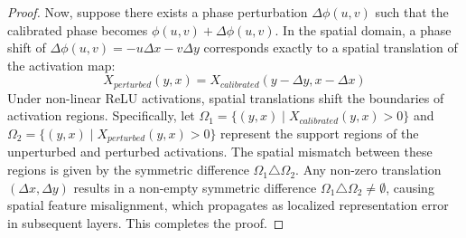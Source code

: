 \documentclass{article}
\theoremstyle{plain}
\theoremstyle{definition}
\theoremstyle{remark}
\begin{document}
\begin{proof}
  Now, suppose there exists a phase perturbation $\Delta \phi(u, v)$ such that the calibrated phase becomes $\phi(u, v) + \Delta \phi(u, v)$. In the spatial domain, a phase shift of $\Delta \phi(u, v) = -u \Delta x - v \Delta y$ corresponds exactly to a spatial translation of the activation map:
  \begin{equation}
    X_{perturbed}(y, x) = X_{calibrated}(y - \Delta y, x - \Delta x)
  \end{equation}
  Under non-linear ReLU activations, spatial translations shift the boundaries of activation regions. Specifically, let $\Omega_1 = \{(y, x) \mid X_{calibrated}(y, x) > 0\}$ and $\Omega_2 = \{(y, x) \mid X_{perturbed}(y, x) > 0\}$ represent the support regions of the unperturbed and perturbed activations. The spatial mismatch between these regions is given by the symmetric difference $\Omega_1 \triangle \Omega_2$. Any non-zero translation $(\Delta x, \Delta y)$ results in a non-empty symmetric difference $\Omega_1 \triangle \Omega_2 \ne \emptyset$, causing spatial feature misalignment, which propagates as localized representation error in subsequent layers. This completes the proof.
\end{proof}
\end{document}
